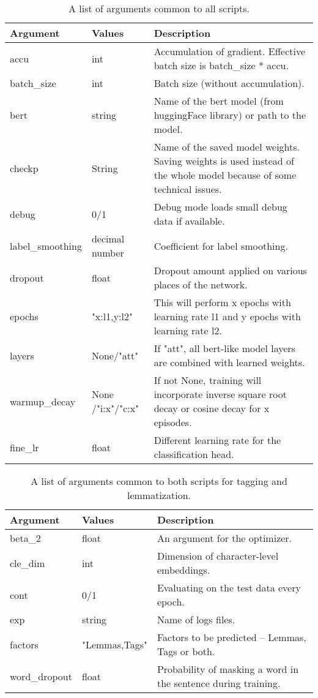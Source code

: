 \begin{table}
\centering
\begin{tabular}{ |p{3cm}|p{}|p{6cm}| } 
 \hline
 Argument & Values & Description \\ 
 \hline \hline
 accu & int & Accumulation of gradient. Effective batch size is batch\_size * accu.  \\\hline
batch\_size & int & Batch size (without accumulation). \\ \hline
bert & string & Name of the bert model (from huggingFace library) or path to the model.  \\ \hline
  checkp & String & Name of the saved model weights. Saving weights is used instead of the whole model because of some technical issues.  \\ \hline
  debug & 0/1 & Debug mode loads small debug data if available. \\ \hline
  label\_smoothing & decimal number & Coefficient for label smoothing. \\ \hline
  dropout & float &  Dropout amount applied on various places of the network.  \\ \hline
 epochs & "x:l1,y:l2"  & This will perform x epochs with learning rate l1 and y epochs with learning rate l2.   \\ \hline
 layers & None/"att" & If "att", all bert-like model layers are combined with learned weights.  \\ \hline
 warmup\_decay & None /"i:x"/"c:x" & If not None, training will incorporate inverse square root decay or cosine decay for x episodes.  \\ \hline
 fine\_lr & float & Different learning rate for the classification head.  \\ \hline
 \hline
\end{tabular}
\caption{A list of arguments common to all scripts.} 
\label{Tab:com_args}
\end{table}


\begin{table}
\centering
\begin{tabular}{ |p{3cm}|p{}|p{6cm}| } 
 \hline
 Argument & Values & Description \\ 
 \hline \hline
 beta\_2 & float & An argument for the optimizer. \\ \hline
 cle\_dim & int & Dimension of character-level embeddings.  \\ \hline
 cont & 0/1 & Evaluating on the test data every epoch.  \\ \hline
 exp & string & Name of logs files.  \\ \hline
 factors & "Lemmas,Tags" & Factors to be predicted -- Lemmas, Tags or both. \\ \hline
word\_dropout & float & Probability of masking a word in the sentence during training.  \\ \hline

\hline

\end{tabular}
\caption{A list of arguments common to both scripts for tagging and lemmatization.} 
\label{Tab:mt_com_args}
\end{table}


